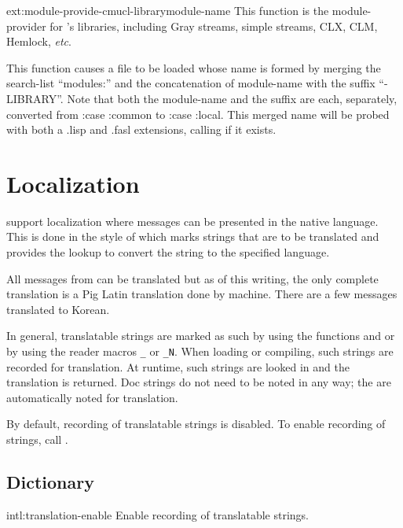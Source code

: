 \begin{defun}{ext:}{module-provide-cmucl-library}{module-name}
  This function is the module-provider for \cmucl's libraries,
  including Gray streams, simple streams, CLX, CLM, Hemlock,
  \emph{etc}.
  
  This function causes a file to be loaded whose name is formed by
  merging the search-list ``modules:'' and the concatenation of
  module-name with the suffix ``-LIBRARY''.  Note that both the
  module-name and the suffix are each, separately, converted from
  :case :common to :case :local.  This merged name will be probed with
  both a .lisp and .fasl extensions, calling  if it exists.
\end{defun}


\section{Localization}
\label{sec:localization}

\cmucl{} support localization where messages can be presented in the
native language.  This is done in the style of  which
marks strings that are to be translated and provides the lookup to
convert the string to the specified language.

All messages from \cmucl{} can be translated but as of this writing,
the only complete translation is a Pig Latin translation done by
machine.  There are a few messages translated to Korean.

In general, translatable strings are marked as such by using the
functions  and  or by using the
reader macros \verb+_+ or \verb+_N+.  When loading or compiling, such
strings are recorded for translation.  At runtime, such strings are
looked in and the translation is returned.  Doc strings do not need to
be noted in any way; the are automatically noted for translation.

By default, recording of translatable strings is disabled.  To enable
recording of strings, call .

\subsection{Dictionary}
\label{sec:localization-dictionary}

\begin{defun}{intl:}{translation-enable}{}
  Enable recording of translatable strings.
\end{defun}

